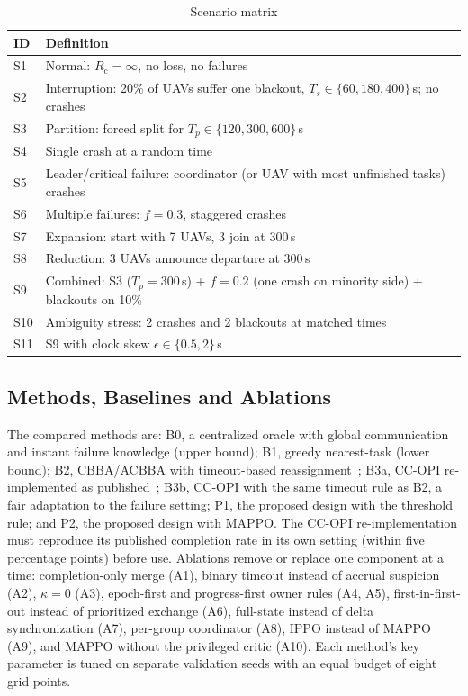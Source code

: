 \documentclass[journal]{IEEEtran}
\newcommand{\Rc}{R_{\mathrm{c}}}
\begin{document}
\begin{table}[!t]
\centering
\caption{Scenario matrix}
\label{tab:scenarios}
\footnotesize
\begin{tabular}{@{}p{0.6cm}p{7.4cm}@{}}
\toprule
ID & Definition\\
\midrule
S1 & Normal: $\Rc=\infty$, no loss, no failures\\
S2 & Interruption: 20\% of UAVs suffer one blackout, $T_s\in\{60,180,400\}$\,s; no crashes\\
S3 & Partition: forced split for $T_p\in\{120,300,600\}$\,s\\
S4 & Single crash at a random time\\
S5 & Leader/critical failure: coordinator (or UAV with most unfinished tasks) crashes\\
S6 & Multiple failures: $f=0.3$, staggered crashes\\
S7 & Expansion: start with 7 UAVs, 3 join at 300\,s\\
S8 & Reduction: 3 UAVs announce departure at 300\,s\\
S9 & Combined: S3 ($T_p=300$\,s) + $f=0.2$ (one crash on minority side) + blackouts on 10\%\\
S10 & Ambiguity stress: 2 crashes and 2 blackouts at matched times\\
S11 & S9 with clock skew $\epsilon\in\{0.5,2\}$\,s\\
\bottomrule
\end{tabular}
\end{table}

\subsection{Methods, Baselines and Ablations}
The compared methods are: B0, a centralized oracle with global communication and instant failure knowledge (upper bound); B1, greedy nearest-task (lower bound); B2, CBBA/ACBBA with timeout-based reassignment~\cite{R02_choi2009,R03_johnson2011}; B3a, CC-OPI re-implemented as published~\cite{R66_liu2026}; B3b, CC-OPI with the same timeout rule as B2, a fair adaptation to the failure setting; P1, the proposed design with the threshold rule; and P2, the proposed design with MAPPO. The CC-OPI re-implementation must reproduce its published completion rate in its own setting (within five percentage points) before use. Ablations remove or replace one component at a time: completion-only merge (A1), binary timeout instead of accrual suspicion (A2), $\kappa=0$ (A3), epoch-first and progress-first owner rules (A4, A5), first-in-first-out instead of prioritized exchange (A6), full-state instead of delta synchronization (A7), per-group coordinator (A8), IPPO instead of MAPPO (A9), and MAPPO without the privileged critic (A10). Each method's key parameter is tuned on separate validation seeds with an equal budget of eight grid points.
\end{document}
